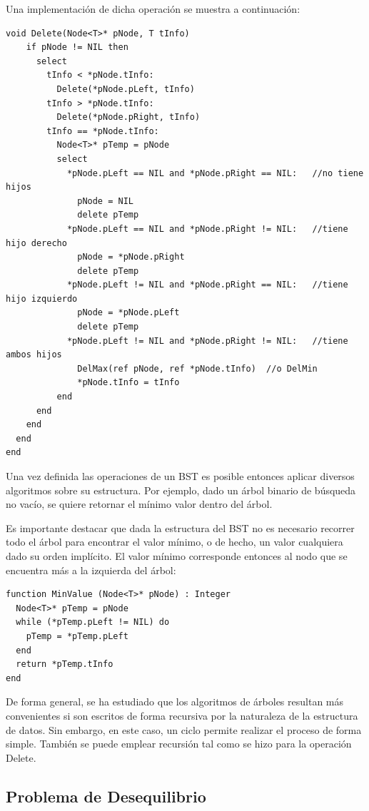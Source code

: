 Una implementación de dicha operación se muestra a continuación:

\begin{lstlisting}[upquote=true, language=pseudo]   
  void Delete(Node<T>* pNode, T tInfo)
    if pNode != NIL then
      select
        tInfo < *pNode.tInfo:
          Delete(*pNode.pLeft, tInfo)
        tInfo > *pNode.tInfo:
          Delete(*pNode.pRight, tInfo)
        tInfo == *pNode.tInfo:
          Node<T>* pTemp = pNode
          select
            *pNode.pLeft == NIL and *pNode.pRight == NIL:	//no tiene hijos
              pNode = NIL
              delete pTemp
            *pNode.pLeft == NIL and *pNode.pRight != NIL:	//tiene hijo derecho
              pNode = *pNode.pRight
              delete pTemp
            *pNode.pLeft != NIL and *pNode.pRight == NIL:	//tiene hijo izquierdo
              pNode = *pNode.pLeft
              delete pTemp
            *pNode.pLeft != NIL and *pNode.pRight != NIL:	//tiene ambos hijos
              DelMax(ref pNode, ref *pNode.tInfo)  //o DelMin
              *pNode.tInfo = tInfo
          end
      end
    end
  end
end
\end{lstlisting}

Una vez definida las operaciones de un BST es posible entonces aplicar diversos algoritmos sobre su estructura. Por ejemplo, dado un árbol binario de búsqueda no vacío, se quiere retornar el mínimo valor dentro del árbol.

Es importante destacar que dada la estructura del BST no es necesario recorrer todo el árbol para encontrar el valor mínimo, o de hecho, un valor cualquiera dado su orden implícito. El valor mínimo corresponde entonces al nodo que se encuentra más a la izquierda del árbol:

\begin{lstlisting}[upquote=true, language=pseudo]
function MinValue (Node<T>* pNode) : Integer
  Node<T>* pTemp = pNode
  while (*pTemp.pLeft != NIL) do
    pTemp = *pTemp.pLeft
  end
  return *pTemp.tInfo
end
\end{lstlisting}

De forma general, se ha estudiado que los algoritmos de árboles resultan más convenientes si son escritos de forma recursiva por la naturaleza de la estructura de datos. Sin embargo, en este caso, un ciclo permite realizar el proceso de forma simple. También se puede emplear recursión tal como se hizo para la operación Delete.

\subsection{Problema de Desequilibrio} \label{lb:desq}

